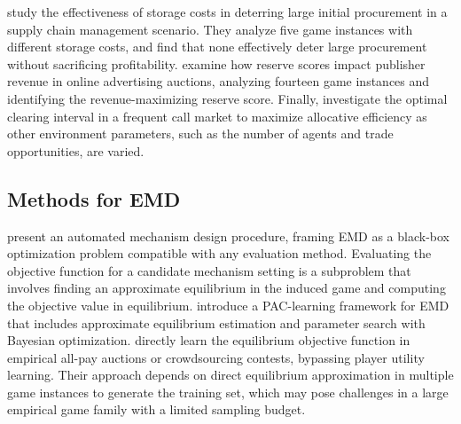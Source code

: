 \citet{vorobeychik2006empirical} study the effectiveness of storage costs in deterring large initial procurement in a supply chain management scenario.
They analyze five game instances with different storage costs, and find that none effectively deter large procurement without sacrificing profitability. 
\citet{jordan2010strategy} examine how reserve scores impact publisher revenue in online advertising auctions, analyzing fourteen game instances and identifying the revenue-maximizing reserve score. 
Finally, \citet{brinkman2017empirical} investigate the optimal clearing interval in a frequent call market to maximize allocative efficiency as other environment parameters, such as the number of agents and trade opportunities, are varied. 

\subsection{Methods for EMD}

\citet{vorobeychik2012constrained} present an automated mechanism design procedure, framing EMD as a black-box optimization problem compatible with any evaluation method.
Evaluating the objective function for a candidate mechanism setting is a subproblem that involves finding an approximate equilibrium in the induced game and computing the objective value in equilibrium. 
\citet{viqueira2020empirical} introduce a PAC-learning framework for EMD that includes approximate equilibrium estimation and parameter search with Bayesian optimization.
\citet{gemp2022designing} directly learn the equilibrium objective function in empirical all-pay auctions or crowdsourcing contests, bypassing player utility learning.
Their approach depends on direct equilibrium approximation in multiple game instances to generate the training set, which may pose challenges in a large empirical game family with a limited sampling budget. 



